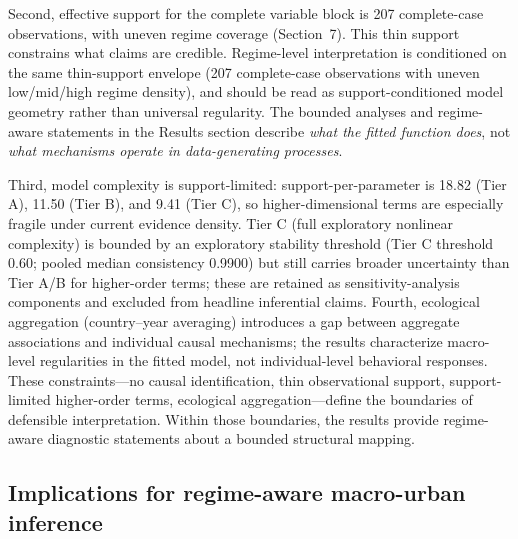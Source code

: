 \documentclass[11pt]{article}
\begin{document}
Second, effective support for the complete variable block is 207 complete-case observations, with uneven regime coverage (Section~7). This thin support constrains what claims are credible. Regime-level interpretation is conditioned on the same thin-support envelope (207 complete-case observations with uneven low/mid/high regime density), and should be read as support-conditioned model geometry rather than universal regularity. The bounded analyses and regime-aware statements in the Results section describe \emph{what the fitted function does}, not \emph{what mechanisms operate in data-generating processes}.

Third, model complexity is support-limited: support-per-parameter is 18.82 (Tier A), 11.50 (Tier B), and 9.41 (Tier C), so higher-dimensional terms are especially fragile under current evidence density. Tier C (full exploratory nonlinear complexity) is bounded by an exploratory stability threshold (Tier C threshold \num{0.60}; pooled median consistency \num{0.9900}) but still carries broader uncertainty than Tier A/B for higher-order terms; these are retained as sensitivity-analysis components and excluded from headline inferential claims. Fourth, ecological aggregation (country--year averaging) introduces a gap between aggregate associations and individual causal mechanisms; the results characterize macro-level regularities in the fitted model, not individual-level behavioral responses. These constraints---no causal identification, thin observational support, support-limited higher-order terms, ecological aggregation---define the boundaries of defensible interpretation. Within those boundaries, the results provide regime-aware diagnostic statements about a bounded structural mapping.

\subsection*{Implications for regime-aware macro-urban inference}
\end{document}
